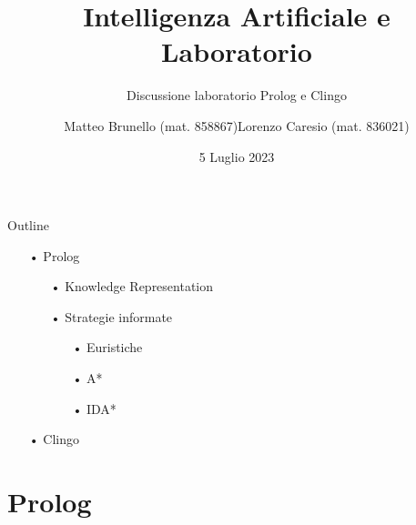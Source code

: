 \documentclass{beamer}
\title{Intelligenza Artificiale e Laboratorio}
\subtitle{Discussione laboratorio Prolog e Clingo}
\date{5 Luglio 2023}
\author{Matteo Brunello (mat. 858867)\newline Lorenzo Caresio (mat. 836021)}
\institute{Università degli Studi di Torino - Dipartimento di Informatica}
\begin{document}
    \maketitle

    \begin{frame}{Outline}
        \begin{itemize}
            \LARGE
            \item[•] Prolog
            \begin{itemize}
                \item[•] Knowledge Representation
                \item[•] Strategie informate
                \begin{itemize}
                    \item[•] Euristiche
                    \item[•] A*
                    \item[•] IDA*
                \end{itemize}
            \end{itemize}
            \item[•] Clingo
        \end{itemize}
    \end{frame}

    \section{Prolog}
\end{document}
